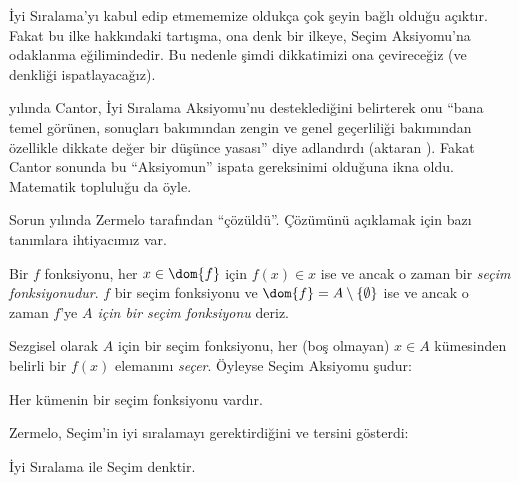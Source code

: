 


İyi Sıralama'yı kabul edip etmememize oldukça çok şeyin bağlı olduğu
açıktır. Fakat bu ilke hakkındaki tartışma, ona denk bir ilkeye, Seçim
Aksiyomu'na odaklanma eğilimindedir. Bu nedenle şimdi dikkatimizi ona
çevireceğiz (ve denkliği ispatlayacağız).

\citeyear{Cantor1883} yılında Cantor, İyi Sıralama Aksiyomu'nu
desteklediğini belirterek onu ``bana temel görünen, sonuçları bakımından
zengin ve genel geçerliliği bakımından özellikle dikkate değer bir düşünce
yasası'' diye adlandırdı (aktaran \citeauthor{Potter2004}
\citeyear[p.~243]{Potter2004}). Fakat Cantor sonunda bu ``Aksiyomun''
ispata gereksinimi olduğuna ikna oldu. Matematik topluluğu da öyle.

Sorun \citeyear{Zermelo1904} yılında Zermelo tarafından ``çözüldü''.
Çözümünü açıklamak için bazı tanımlara ihtiyacımız var.

\begin{defn}
Bir $f$ fonksiyonu, her $x\in\dom{f}$ için $f(x)\in x$ ise ve ancak o
zaman bir \emph{seçim fonksiyonudur}. $f$ bir seçim fonksiyonu ve
$\dom{f}=A\setminus\{\emptyset\}$ ise ve ancak o zaman $f$'ye
\emph{$A$ için bir seçim fonksiyonu} deriz.
\end{defn}

Sezgisel olarak $A$ için bir seçim fonksiyonu, her (boş olmayan)
$x\in A$ kümesinden belirli bir $f(x)$ elemanını \emph{seçer}. Öyleyse
Seçim Aksiyomu şudur:

\begin{axiom}[Seçim]
	Her kümenin bir seçim fonksiyonu vardır.
\end{axiom}

Zermelo, Seçim'in iyi sıralamayı gerektirdiğini ve tersini gösterdi:

\begin{thm}[$\ZF$ içinde]
İyi Sıralama ile Seçim denktir.
\end{thm}


